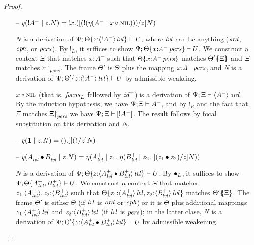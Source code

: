 \begin{proof}
\begin{itemize}
\item[--] $\etapa{z}{N}{{!}A^-}
           = \tbangl{x}{([(\tbangr{(\etana{\tfocusl{x}{\tnil}}{A^-})})/z]N)}$ 
  \smallskip

  $N$ is a derivation of 
  $\foc{\Psi}{\tackon{\Theta}{z{:}\islvl{\susp{{!}A^-}}}}{U}$, where
  $\mlvl$ can be anything ($\mtrue$, $\meph$, or $\mpers$).
  By ${!}_L$, it suffices to show 
  $\foc{\Psi}{\tackon{\Theta}{x{:}\ispers{A^-}}}{U}$.
  We construct a context $\Xi$ that matches $x{:}A^-$ such that
  $\tackon{\Theta}{x{:}\ispers{A^-}}$ matches $\frameoff{\Theta'}{\Xi}$
  and $\Xi$ matches $\restrictto{\Xi}{\mpers}$. The frame
  $\Theta'$ is $\Theta$ plus the mapping 
  $x{:}\ispers{A^-}$, and $N$ is a derivation of 
  $\foc{\Psi}{\tackon{\Theta'}{z{:}\islvl{\susp{{!}A^-}}}}{U}$
  by admissible weakeing.
  \smallskip

  $\tfocusl{x}{\tnil}$ (that is, ${\it focus}_L$ followed by
  ${\it id}^-$) is a derivation of $\foc{\Psi}{\Xi}{\istrue{\susp{A^-}}}$. 
  By the induction hypothesis, we have $\foc{\Psi}{\Xi}{A^-}$, 
  and by ${!}_R$ and the fact that $\Xi$ matches $\restrictto{\Xi}{\mpers}$
  we have $\foc{\Psi}{\Xi}{[{!}A^-]}$. The result follows
  by focal substitution on this derivation and $N$.
  \smallskip

\item[--] $\etapa{z}{N}{\one} = \tonel{([\toner/z]N)}$ 
\item[--] $\etapa{z}{N}{A^+_\mlvl \fuse B^+_\mlvl} =
            \etapa{z_1}
             {~\etapa{z_2}
              {~[(\tfuser{z_1}{z_2})/z]N}
              {B^+_\mlvl}}
             {A^+_\mlvl}$
  \smallskip

  $N$ is a derivation of 
  $\foc{\Psi}{\tackon{\Theta}
   {z{:}\islvl{\susp{A^+_\mlvl \fuse B^+_\mlvl}}}}{U}$. 
  By ${\fuse}_L$, it suffices to
  show $\foc{\Psi}{\tackon{\Theta}{A^+_\mlvl, B^+_\mlvl}}{U}$.
  We construct a context $\Xi$ that matches 
  $\matchconj{z_1{:}\susp{A^+_\mlvl}}{z_2{:}\susp{B^+_\mlvl}}$
  such that $\tackon{\Theta}
              {\mkconj{z_1{:}\islvl{\susp{A^+_\mlvl}}}
                      {z_2{:}\islvl{\susp{B^+_\mlvl}}}}$
  matches $\frameoff{\Theta'}{\Xi}$. The frame 
  $\Theta'$ is either $\Theta$ (if $\mlvl$ is $\mtrue$ or $\meph$) 
  or it is $\Theta$ plus additional mappings
  $z_1{:}\islvl{\susp{A^+_\mlvl}}$ and 
  $z_2{:}\islvl{\susp{B^+_\mlvl}}$ (if $\mlvl$ is $\mpers$); in the
  latter clase, $N$ is a derivation of 
  $\foc{\Psi}{\tackon{\Theta'}
   {z{:}\islvl{\susp{A^+_\mlvl \fuse B^+_\mlvl}}}}{U}$ by admissible weakening.
  \smallskip



\end{itemize}
\end{proof}
